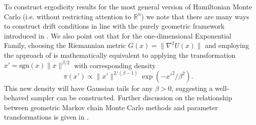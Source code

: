 \documentclass[bj,numbers,noshowframe]{imsart}
\newcommand{\e}{\varepsilon}
\theoremstyle{definition}
\theoremstyle{plain}
\theoremstyle{definition}
\begin{document}
To construct ergodicity results for the most general version of Hamiltonian Monte Carlo (i.e. without restricting attention to $\mathbb{R}^n$) we note that there are many ways to construct drift conditions in line with the purely geometric framework introduced in \citep{betancourt2014geometric}.  We also point out that for the one-dimensional Exponential Family, choosing the Riemannian metric $G(x) = \|\nabla^2U(x)\|$ and employing the approach of \citep{girolami2011riemann} is mathematically equivalent to applying the transformation $x' = \text{sgn}(x)\|x\|^{\beta/2}$ with corresponding density
\[
\pi(x') \propto \|x'\|^{2/(\beta - 1)}\exp \left( -x'^2/\beta^2 \right).
\]
This new density will have Gaussian tails for any $\beta >0$, suggesting a well-behaved sampler can be constructed.  Further discussion on the relationship between geometric Markov chain Monte Carlo methods and parameter transformations is given in \citep{livingstone2014information}.




\end{document}
